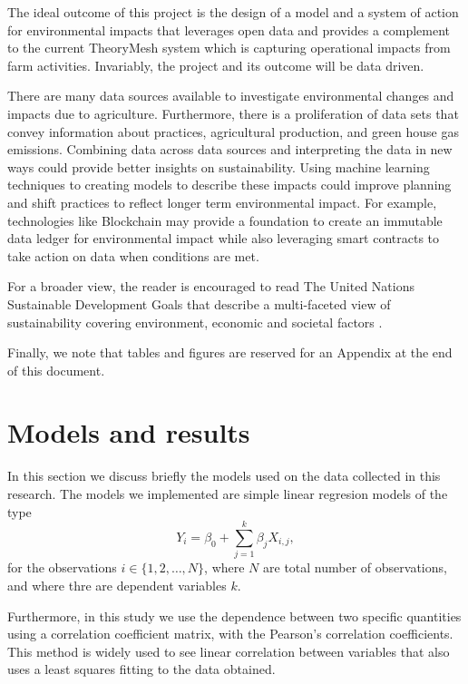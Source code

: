 \documentclass[11pt]{article}
\numberwithin{equation}{section}
\begin{document}
The ideal outcome of this project is the design of a model and a system of action for environmental impacts that leverages open data and provides a complement to the current TheoryMesh system which is capturing operational impacts from farm activities. Invariably, the project and its outcome will be data driven.

There are many data sources available to investigate environmental changes and impacts due to agriculture. Furthermore, there is a proliferation of data sets that convey information about practices, agricultural production, and green house gas emissions. Combining data across data sources and interpreting the data in new ways could provide better insights on sustainability. Using machine learning techniques to creating models to describe these impacts could improve planning and shift practices to reflect longer term environmental impact. For example, technologies like Blockchain may provide a foundation to create an immutable data ledger for environmental impact while also leveraging smart contracts to take action on data when conditions are met.

For a broader view, the reader is encouraged to read The United Nations Sustainable Development Goals that describe a multi-faceted view of sustainability covering environment, economic and societal factors \cite{UN-edgar}.

Finally, we note that tables and figures are reserved for an Appendix at the end of this document.


\section{Models and results}\label{Corr_modl}

In this section we discuss briefly the models used on the data collected  in this research. The models we implemented are simple linear regresion models of the type 
\begin{equation}
Y_i = \beta_0 + \sum_{j=1}^k \beta_j X_{i,j},    
\end{equation}
 for the observations $i\in \{1, 2, \dots, N\}$, where $N$ are total number of observations, and where thre are dependent variables $k$.
 
 Furthermore, in this study we use the dependence between two specific quantities using  a correlation coefficient matrix, with  the Pearson's correlation coefficients. This method is widely used to see linear correlation between variables that also uses a least squares fitting to the data obtained.
\end{document}
